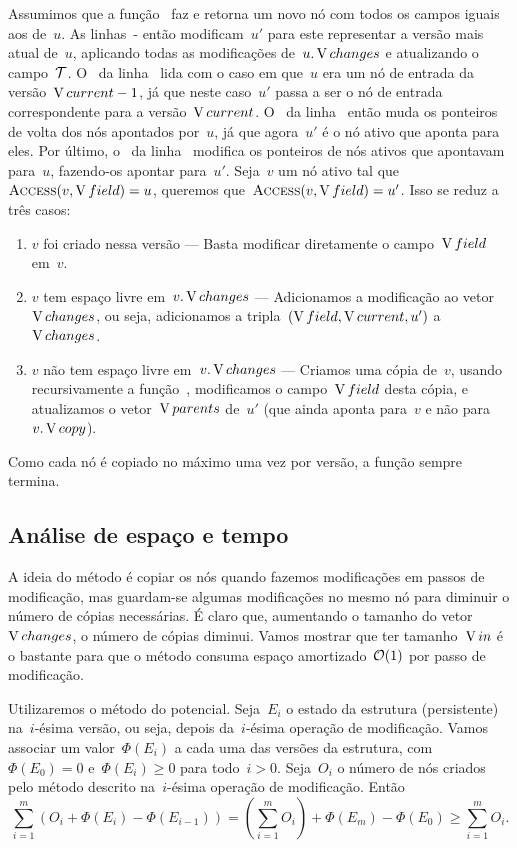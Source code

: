 \documentclass[main.tex]{subfiles}
\begin{document}
Assumimos que a função~ faz e retorna um novo nó com todos os campos iguais aos de~$u$. As linhas~- então modificam~$u'$ para este representar a versão mais atual de~$u$, aplicando todas as modificações de~$u.\operatorname{V}{changes}$ e atualizando o campo~$\mathcal{T}$. O~ da linha~ lida com o caso em que~$u$ era um nó de entrada da versão~$\operatorname{V}{current}-1$, já que neste caso~$u'$ passa a ser o nó de entrada correspondente para a versão~$\operatorname{V}{current}$. O~ da linha~ então muda os ponteiros de volta dos nós apontados por~$u$, já que agora~$u'$ é o nó ativo que aponta para eles. Por último, o~ da linha~ modifica os ponteiros de nós ativos que apontavam para~$u$, fazendo-os apontar para~$u'$. Seja~$v$ um nó ativo tal que~$\Call{Access}{v, \V{field}} = u$, queremos que~$\Call{Access}{v, \V{field}} = u'$. Isso se reduz a três casos:
\begin{enumerate}
\item $v$ foi criado nessa versão --- Basta modificar diretamente o campo~$\operatorname{V}{field}$ em~$v$.
\item $v$ tem espaço livre em~$v.\operatorname{V}{changes}$ --- Adicionamos a modificação ao vetor~$\operatorname{V}{changes}$, ou seja, adicionamos a tripla~$(\operatorname{V}{field}, \operatorname{V}{current}, u')$ a~$\operatorname{V}{changes}$.
\item $v$ não tem espaço livre em~$v.\operatorname{V}{changes}$ --- Criamos uma cópia de~$v$, usando recursivamente a função~\textsc{}, modificamos o campo~$\operatorname{V}{field}$ desta cópia, e atualizamos o vetor~$\operatorname{V}{parents}$ de~$u'$ (que ainda aponta para~$v$ e não para~$v.\operatorname{V}{copy}$).
\end{enumerate}

Como cada nó é copiado no máximo uma vez por versão, a função sempre termina.

\subsection{Análise de espaço e tempo}

A ideia do método é copiar os nós quando fazemos modificações em passos de modificação, mas guardam-se algumas modificações no mesmo nó para diminuir o número de cópias necessárias. É claro que, aumentando o tamanho do vetor~$\operatorname{V}{changes}$, o número de cópias diminui. Vamos mostrar que ter tamanho~$\operatorname{V}{in}$ é o bastante para que o método consuma espaço amortizado~$\mathcal{O}(1)$ por passo de modificação.

Utilizaremos o método do potencial. Seja~$E_i$ o estado da estrutura (persistente) na~$i$-ésima versão, ou seja, depois da~$i$-ésima operação de modificação. Vamos associar um valor~$\Phi(E_i)$ a cada uma das versões da estrutura, com~$\Phi(E_0) = 0$ e~$\Phi(E_i) \geq 0$ para todo~$i > 0$. Seja~$O_i$ o número de nós criados pelo método descrito na~$i$-ésima operação de modificação. Então
$$ \sum\limits_{i=1}^{m}{\left(O_i + \Phi(E_i) - \Phi(E_{i-1})\right)} = \left(\sum\limits_{i=1}^m{O_i}\right) + \Phi(E_m) - \Phi(E_0) \geq \sum\limits_{i=1}^m{O_i}. $$
\end{document}
